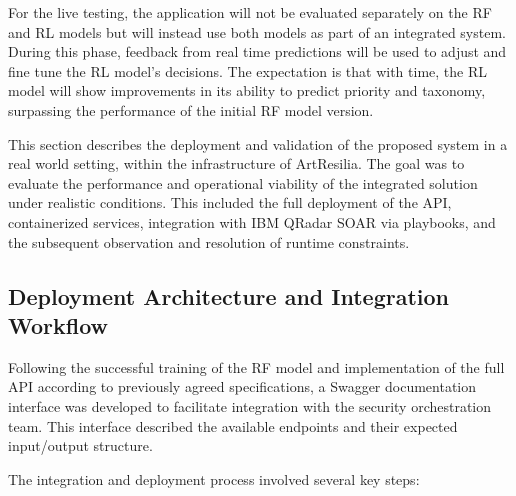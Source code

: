 For the live testing, the application will not be evaluated separately on the RF and RL models but will instead use both models as part of an integrated system. 
During this phase, feedback from real time predictions will be used to adjust and fine tune the RL model's decisions. 
The expectation is that with time, the RL model will show improvements in its ability to predict priority and taxonomy, surpassing the performance of the initial RF model version.

This section describes the deployment and validation of the proposed system in a real world setting, within the infrastructure of ArtResilia. 
The goal was to evaluate the performance and operational viability of the integrated solution under realistic conditions. 
This included the full deployment of the API, containerized services, integration with IBM QRadar SOAR via playbooks, and the subsequent observation and resolution of runtime constraints.

\subsection{Deployment Architecture and Integration Workflow}

Following the successful training of the RF model and implementation of the full API according to previously agreed specifications, a Swagger documentation interface was developed to facilitate integration with the security orchestration team. 
This interface described the available endpoints and their expected input/output structure.

The integration and deployment process involved several key steps:

